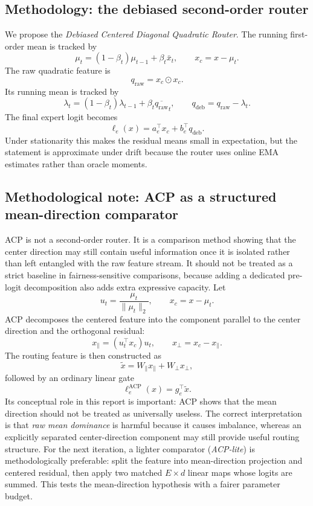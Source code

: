 \documentclass[11pt]{article}
\begin{document}
\subsection{Methodology: the debiased second-order router}
We propose the \emph{Debiased Centered Diagonal Quadratic Router}. The running first-order mean is tracked by
\[
\mu_t = (1-\beta_t)\mu_{t-1} + \beta_t \bar{x}_t,
\qquad
x_c = x-\mu_t.
\]
The raw quadratic feature is
\[
q_{\mathrm{raw}} = x_c \odot x_c.
\]
Its running mean is tracked by
\[
\lambda_t = (1-\beta_t)\lambda_{t-1} + \beta_t \overline{q_{\mathrm{raw}}}_t,
\qquad
q_{\mathrm{deb}} = q_{\mathrm{raw}}-\lambda_t.
\]
The final expert logit becomes
\[
\ell_e(x)=a_e^\top x_c + b_e^\top q_{\mathrm{deb}}.
\]
Under stationarity this makes the residual means small in expectation, but the statement is approximate under drift because the router uses online EMA estimates rather than oracle moments.

\subsection{Methodological note: ACP as a structured mean-direction comparator}
ACP is not a second-order router. It is a comparison method showing that the center direction may still contain useful information once it is isolated rather than left entangled with the raw feature stream. It should not be treated as a strict baseline in fairness-sensitive comparisons, because adding a dedicated pre-logit decomposition also adds extra expressive capacity. Let
\[
u_t=\frac{\mu_t}{\|\mu_t\|_2},
\qquad
x_c=x-\mu_t.
\]
ACP decomposes the centered feature into the component parallel to the center direction and the orthogonal residual:
\[
x_{\parallel}=(u_t^\top x_c)u_t,
\qquad
x_{\perp}=x_c-x_{\parallel}.
\]
The routing feature is then constructed as
\[
\tilde x = W_{\parallel}x_{\parallel}+W_{\perp}x_{\perp},
\]
followed by an ordinary linear gate
\[
\ell_e^{\mathrm{ACP}}(x)=g_e^\top \tilde x.
\]
Its conceptual role in this report is important: ACP shows that the mean direction should not be treated as universally useless. The correct interpretation is that \emph{raw mean dominance} is harmful because it causes imbalance, whereas an explicitly separated center-direction component may still provide useful routing structure. For the next iteration, a lighter comparator (\emph{ACP-lite}) is methodologically preferable: split the feature into mean-direction projection and centered residual, then apply two matched $E\times d$ linear maps whose logits are summed. This tests the mean-direction hypothesis with a fairer parameter budget.
\end{document}
